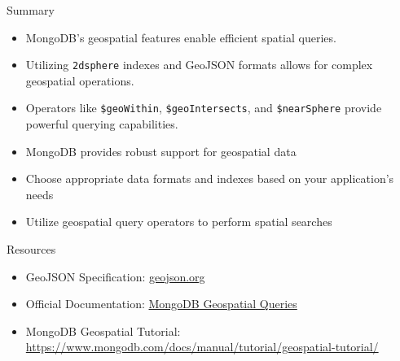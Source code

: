 \documentclass[aspectratio=169]{beamer}
\begin{document}

\begin{frame}{Summary}
	\begin{itemize}
		\item MongoDB's geospatial features enable efficient spatial queries.
		\item Utilizing \texttt{2dsphere} indexes and GeoJSON formats allows for complex geospatial operations.
		\item Operators like \texttt{\$geoWithin}, \texttt{\$geoIntersects}, and \texttt{\$nearSphere} provide powerful querying capabilities.
        \item MongoDB provides robust support for geospatial data
        \item Choose appropriate data formats and indexes based on your application's needs
        \item Utilize geospatial query operators to perform spatial searches
	\end{itemize}
\end{frame}

\begin{frame}{Resources}
  \begin{itemize}
    \item GeoJSON Specification: \href{https://geojson.org/}{geojson.org}
    \item Official Documentation: \href{https://www.mongodb.com/docs/manual/geospatial-queries/}{MongoDB Geospatial Queries}
	\item MongoDB Geospatial Tutorial: \url{https://www.mongodb.com/docs/manual/tutorial/geospatial-tutorial/}
  \end{itemize}
\end{frame}
\end{document}
